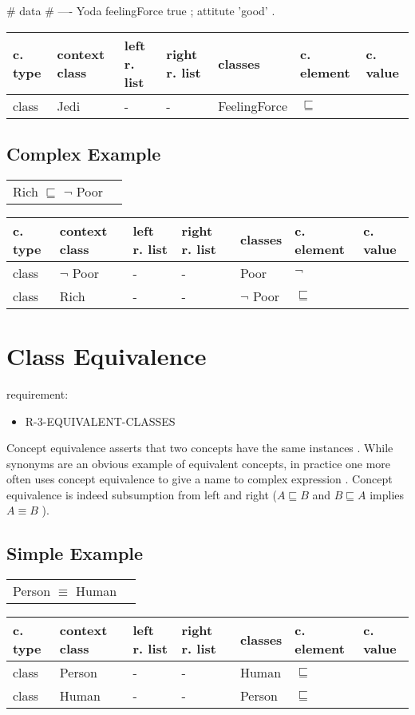 \documentclass{llncs}
\newenvironment{gcotable}{
  \scriptsize
  \sffamily
  \vspace{0.3cm}
	\begin{center}
  \begin{tabular}{l|l|l|l|l|l|l}
  \hline
  \textbf{c. type} & \textbf{context class} & \textbf{left r. list} & \textbf{right r. list} & \textbf{classes} & \textbf{c. element} & \textbf{c. value} \\
  \hline

}{
  \hline
  \end{tabular}
	\end{center}
}
\newenvironment{DL}{
	\begin{center}
  \begin{tabular}{r l}

}{
  \end{tabular}
	\end{center}
}
\begin{document}
\begin{ex}
# data
# ----
Yoda 
    feelingForce true ;
    attitute 'good' .
\end{ex}

\begin{gcotable}
class & Jedi & - & - & FeelingForce & $\sqsubseteq$ \\
\end{gcotable}

\subsection{Complex Example}

\begin{DL}
Rich $\sqsubseteq$ $\neg$ Poor 
\end{DL}

\begin{gcotable}
class & $\neg$ Poor & - & - & Poor & $\neg$ \\
class & Rich & - & - & $\neg$ Poor & $\sqsubseteq$ \\
\end{gcotable}

\section{Class Equivalence}

requirement:

\begin{itemize}
	\item R-3-EQUIVALENT-CLASSES
\end{itemize}

Concept equivalence asserts that two concepts have the same instances \cite{Kroetzsch2012}.
While synonyms are an obvious example of equivalent concepts, in practice one more
often uses concept equivalence to give a name to complex expression  \cite{Kroetzsch2012}.
Concept equivalence is indeed subsumption from left and right ($A \sqsubseteq B$ and $B \sqsubseteq A$ implies $A \equiv B$ ).

\subsection{Simple Example}

\begin{DL}
Person $\equiv$ Human
\end{DL}

\begin{gcotable}
class & Person & - & - & Human & $\sqsubseteq$ \\
class & Human & - & - & Person & $\sqsubseteq$ \\
\end{gcotable}
\end{document}
